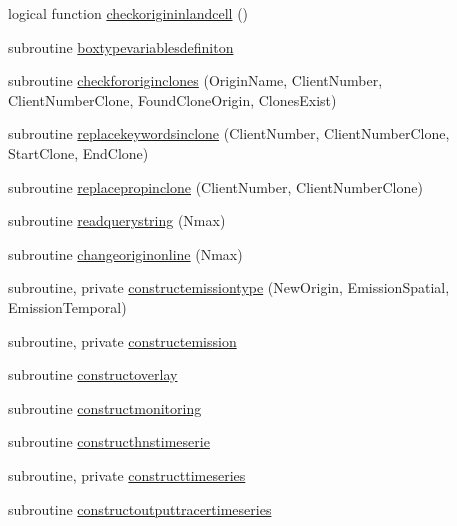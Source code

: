 \begin{DoxyCompactItemize}
\item 
logical function \mbox{\hyperlink{namespacemodulelagrangianglobal_a356193ac68adebe4d96ff99a2bb2ba2d}{checkorigininlandcell}} ()
\item 
subroutine \mbox{\hyperlink{namespacemodulelagrangianglobal_af59eca67cb4a5c0dd0d805d6a08538ba}{boxtypevariablesdefiniton}}
\item 
subroutine \mbox{\hyperlink{namespacemodulelagrangianglobal_a3ffd33996e7947926b76916d8e614ab8}{checkfororiginclones}} (Origin\+Name, Client\+Number, Client\+Number\+Clone, Found\+Clone\+Origin, Clones\+Exist)
\item 
subroutine \mbox{\hyperlink{namespacemodulelagrangianglobal_a9d7ee93eda9bae199e15651c725e4c7c}{replacekeywordsinclone}} (Client\+Number, Client\+Number\+Clone, Start\+Clone, End\+Clone)
\item 
subroutine \mbox{\hyperlink{namespacemodulelagrangianglobal_a203dd84eb4a1c9f6704c8a3af740be1b}{replacepropinclone}} (Client\+Number, Client\+Number\+Clone)
\item 
subroutine \mbox{\hyperlink{namespacemodulelagrangianglobal_abfdcea7a4323d6b93cc8c43b343ec0b3}{readquerystring}} (Nmax)
\item 
subroutine \mbox{\hyperlink{namespacemodulelagrangianglobal_ac5eba799ef6e5891159d027cee26909c}{changeoriginonline}} (Nmax)
\item 
subroutine, private \mbox{\hyperlink{namespacemodulelagrangianglobal_a33d8b80b431bb224984d6f64b001cd6a}{constructemissiontype}} (New\+Origin, Emission\+Spatial, Emission\+Temporal)
\item 
subroutine, private \mbox{\hyperlink{namespacemodulelagrangianglobal_a19776a2b14eca267eac2af7e53ce5c77}{constructemission}}
\item 
subroutine \mbox{\hyperlink{namespacemodulelagrangianglobal_a66523dedf972d121569f3902f6d4a148}{constructoverlay}}
\item 
subroutine \mbox{\hyperlink{namespacemodulelagrangianglobal_ae93400b6f236b2e44a7b90febb2be220}{constructmonitoring}}
\item 
subroutine \mbox{\hyperlink{namespacemodulelagrangianglobal_a56d6b284b701a9103a92e0956ad4cc6a}{constructhnstimeserie}}
\item 
subroutine, private \mbox{\hyperlink{namespacemodulelagrangianglobal_ace8bf8bfcb4ec7384b2bb7af77034f8e}{constructtimeseries}}
\item 
subroutine \mbox{\hyperlink{namespacemodulelagrangianglobal_a43f3d0f411e8d9b0df16d63f033382ff}{constructoutputtracertimeseries}}

\end{DoxyCompactItemize}
